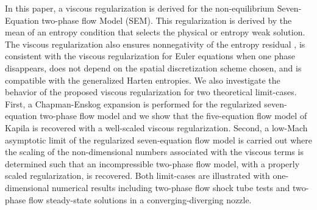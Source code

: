 In this paper, a viscous regularization is derived for the non-equilibrium Seven-Equation two-phase flow Model (SEM). 
This regularization is derived by the mean of an entropy condition that selects the physical or entropy weak solution.
The viscous regularization also ensures nonnegativity of the entropy residual , is consistent with the viscous regularization for Euler equations 
when one phase disappears, does not depend on the spatial discretization scheme chosen, and is compatible with the generalized Harten entropies. 
We also investigate the behavior of the proposed viscous regularization for two theoretical limit-cases. 
First, a Chapman-Enskog expansion is performed for the regularized seven-equation two-phase flow model and we show that the five-equation flow 
model of Kapila is recovered with a well-scaled viscous regularization. 
Second, a low-Mach asymptotic limit of the regularized seven-equation flow model is carried out where the scaling of the non-dimensional numbers
associated with the viscous terms is determined such that an incompressible two-phase flow model, with a properly scaled regularization, is recovered. 
Both limit-cases are illustrated with one-dimensional numerical results including two-phase flow shock tube tests 
and two-phase flow steady-state solutions in a converging-diverging nozzle.